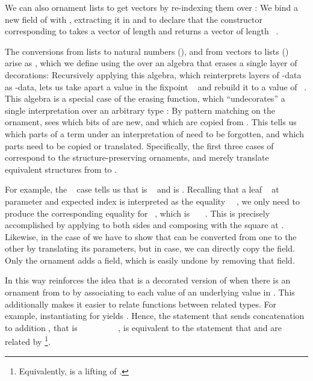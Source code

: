 We can also ornament lists to get vectors by re-indexing them over \bN{}:
We bind a new field of \bN{} with , extracting it in  and  to declare that the constructor corresponding to  takes a vector of length  and returns a vector of length \ . 

The conversions from lists to natural numbers (), and from vectors to lists () arise as , which we define using the  over an algebra that erases a single layer of decorations:
Recursively applying this algebra, which reinterprets layers of -data as -data, lets us take apart a value in the fixpoint \  and rebuild it to a value of \ . This algebra
is a special case of the erasing function, which ``undecorates'' a single interpretation over an arbitrary type :
By pattern matching on the ornament,  sees which bits of  are new, and which are copied from . This tells us which parts of a term  under an interpretation of  need to be forgotten, and which parts need to be copied or translated. Specifically, the first three cases of  correspond to the structure-preserving ornaments, and merely translate equivalent structures from  to .

For example, the \  case tells us that  is \  and  is  . Recalling that a leaf \  at parameter  and expected index  is interpreted as the equality \ \ , we only need to produce the corresponding equality for  \ , which is \ \ \ . This is precisely accomplished by applying  to both sides and composing with the square  at . Likewise, in the case of  we have to show that  can be converted from one  to the other  by translating its parameters, but in  case, we can directly copy the field. Only the ornament  adds a field, which is easily undone by removing that field.

In this way  reinforces the idea that  is a decorated version of  when there is an ornament from  to  by associating to each value of  an underlying value in . This additionally makes it easier to relate functions between related types. For example, instantiating  for  yields . Hence, the statement that  sends concatenation \AF{\_++\_} to addition \AF{\_+\_}, that is \ \ \AF{++}\ \ \ \ \ \AF{+}\ \ , is equivalent to the statement that \AF{\_++\_} and \AF{\_+\_} are related by \footnote{Equivalently, \AF{\_++\_} is a lifting of \AF{\_+\_} \cite{orntrans}.}.

